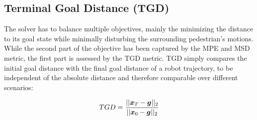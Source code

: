 \subsection{Terminal Goal Distance (TGD)}
The solver has to balance multiple objectives, mainly the minimizing the distance to its goal state while minimally disturbing the surrounding pedestrian's motions. While the second part of the objective has been captured by the MPE and MSD metric, the first part is assessed by the TGD metric. TGD simply compares the initial goal distance with the final goal distance of a robot trajectory, to be independent of the absolute distance and therefore comparable over different scenarios:

\begin{equation}
TGD = \frac{||\boldsymbol{x}_T - \boldsymbol{g}||_2}{||\boldsymbol{x}_0 - \boldsymbol{g}||_2}
\end{equation}
